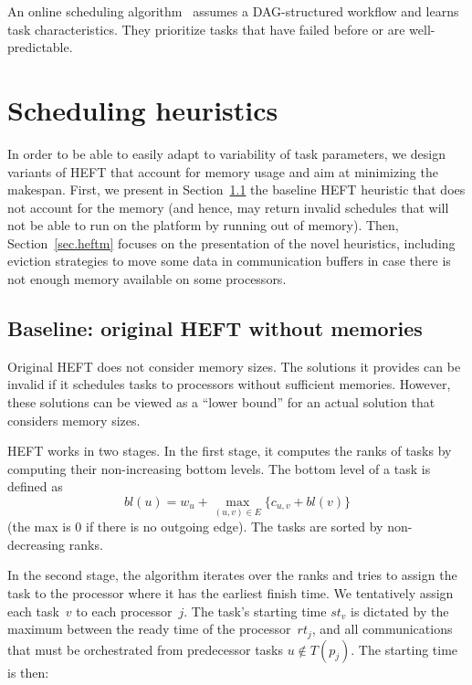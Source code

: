 \documentclass[conference]{IEEEtran}
\newcommand{\skug}[1]{{\color{blue}[SK: #1]}}
\begin{document}
    An online scheduling algorithm~\cite{Witt2018POS} assumes a DAG-structured workflow and learns task characteristics.
    They prioritize tasks that have failed before or are well-predictable.

    \section{Scheduling heuristics} %
\label{sec.heuristics}


In order to be able to easily adapt to variability of task parameters, we design
variants of HEFT that account for memory usage and aim at minimizing the makespan.
First, we present in Section~\ref{sec.heft} the baseline HEFT heuristic that does not account for the memory
(and hence, may return invalid schedules that will not be able to run on the platform
by running out of memory).  Then, Section~\ref{sec.heftm} focuses on the presentation of the novel
heuristics, including eviction strategies to move some data in communication buffers
in case there is not enough memory available on some processors.

    \subsection{Baseline: original HEFT without memories}
\label{sec.heft}

    Original HEFT does not consider memory sizes.
    The solutions it provides can be invalid if it schedules tasks to processors without sufficient memories.
    However, these solutions can be viewed as a ``lower bound'' for an actual solution that considers memory sizes.

    HEFT works in two stages.
    In the first stage, it computes the ranks of tasks by computing their non-increasing bottom levels.
    The bottom level of a task is defined as
    $$bl(u) = w_u + \max_{(u,v)\in E} \{c_{u,v} + bl(v)\}$$
    (the max is 0 if there is no outgoing edge).
    The tasks are sorted by non-decreasing ranks.

    In the second stage, the algorithm iterates over the ranks and tries to assign the task to the processor where it
    has the earliest finish time.
    We tentatively assign each task~$v$ to each processor~$j$.
    The task's starting time $st_v$ is dictated by the maximum between the ready time of the processor~$rt_j$,
    and all communications that
    must be orchestrated from predecessor tasks $u\notin T(p_j)$.
    The starting time is then:
\end{document}
